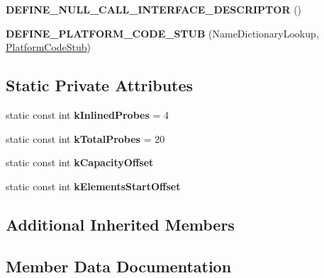 \begin{DoxyCompactItemize}
\item 
{\bfseries D\+E\+F\+I\+N\+E\+\_\+\+N\+U\+L\+L\+\_\+\+C\+A\+L\+L\+\_\+\+I\+N\+T\+E\+R\+F\+A\+C\+E\+\_\+\+D\+E\+S\+C\+R\+I\+P\+T\+OR} ()\hypertarget{classv8_1_1internal_1_1_name_dictionary_lookup_stub_a56e72757ba3ab8928220e89075ca6848}{}\label{classv8_1_1internal_1_1_name_dictionary_lookup_stub_a56e72757ba3ab8928220e89075ca6848}

\item 
{\bfseries D\+E\+F\+I\+N\+E\+\_\+\+P\+L\+A\+T\+F\+O\+R\+M\+\_\+\+C\+O\+D\+E\+\_\+\+S\+T\+UB} (Name\+Dictionary\+Lookup, \hyperlink{classv8_1_1internal_1_1_platform_code_stub}{Platform\+Code\+Stub})\hypertarget{classv8_1_1internal_1_1_name_dictionary_lookup_stub_a9b6511fda10d2ab14ce9366da895bb71}{}\label{classv8_1_1internal_1_1_name_dictionary_lookup_stub_a9b6511fda10d2ab14ce9366da895bb71}

\end{DoxyCompactItemize}
\subsection*{Static Private Attributes}
\begin{DoxyCompactItemize}
\item 
static const int {\bfseries k\+Inlined\+Probes} = 4\hypertarget{classv8_1_1internal_1_1_name_dictionary_lookup_stub_a96ce5238eff0f1c1103086764710cc89}{}\label{classv8_1_1internal_1_1_name_dictionary_lookup_stub_a96ce5238eff0f1c1103086764710cc89}

\item 
static const int {\bfseries k\+Total\+Probes} = 20\hypertarget{classv8_1_1internal_1_1_name_dictionary_lookup_stub_a5cf6151c556011002a90e5cc05edb5ed}{}\label{classv8_1_1internal_1_1_name_dictionary_lookup_stub_a5cf6151c556011002a90e5cc05edb5ed}

\item 
static const int {\bfseries k\+Capacity\+Offset}
\item 
static const int {\bfseries k\+Elements\+Start\+Offset}
\end{DoxyCompactItemize}
\subsection*{Additional Inherited Members}


\subsection{Member Data Documentation}
